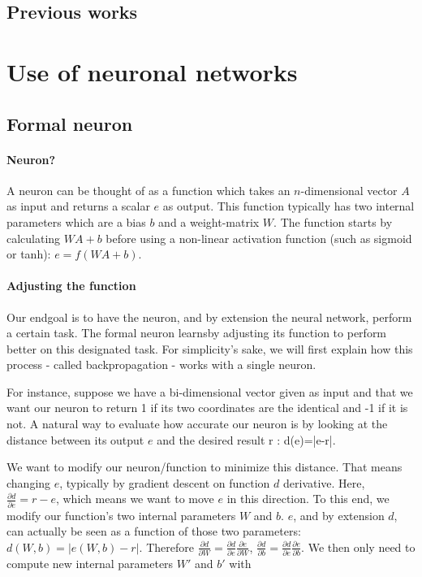 \documentclass[conference]{IEEEtran}
\begin{document}
\subsection{Previous works}

\section{Use of neuronal networks}

\subsection{Formal neuron}

\paragraph{Neuron?}
A neuron can be thought of as a function which takes an $n$-dimensional vector $A$ as input and returns a scalar $e$ as output. This function typically has two internal parameters which are a bias $b$ and a weight-matrix $W$. The function starts by calculating $WA+b$ before using a non-linear activation function (such as sigmoid or tanh): $e=f(WA+b)$.

\paragraph{Adjusting the function}

Our endgoal is to have the neuron, and by extension the neural network, perform
a certain task. The formal neuron \og learns\fg by adjusting its function to perform better on
this designated task. For simplicity's sake, we will first explain how this
process - called \og backpropagation\fg{} - works with a single neuron.

For instance, suppose we have a bi-dimensional vector given as input and that we
want our neuron to return 1 if its two coordinates are the identical and -1 if
it is not. A natural way to evaluate how accurate our neuron is by looking at the
distance between its output $e$ and the desired result r : d(e)=|e-r|.

We want to modify our neuron/function to minimize this distance. That means
changing $e$, typically by gradient descent on function $d$ derivative. Here,
$\frac{\partial d}{\partial e} = r-e$, which means we want to \og move\fg{} $e$ in this
direction. To this end, we modify our function's two internal parameters $W$ and
$b$. $e$, and by extension $d$, can actually be seen as a function of those two
parameters: $d(W,b)=|e(W,b)-r|$. Therefore $\frac{\partial d}{\partial W}
   = \frac{\partial d}{\partial e}\frac{\partial e}{\partial W}$,
$\frac{\partial d}{\partial b}
   = \frac{\partial d}{\partial e}\frac{\partial e}{\partial b}$. We then only
   need to compute new internal parameters $W'$ and $b'$ with 
\end{document}
